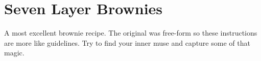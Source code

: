 \section[7-layer brownies]{
    Seven Layer Brownies
}

\begin{recipestats}[
        servings=9 brownies,
        source=Rand Pearson,
    ]
\end{recipestats}

\begin{recipeabstract}
    A most excellent brownie recipe.
    The original was free-form so these instructions are more like guidelines.
    Try to find your inner muse and capture some of that magic.
\end{recipeabstract}

\begin{ingredientcolumns}
    \begin{ingredientblock}
        \\
        \\
        \\
        \\
        \\
        \\
    \end{ingredientblock}
\end{ingredientcolumns}

